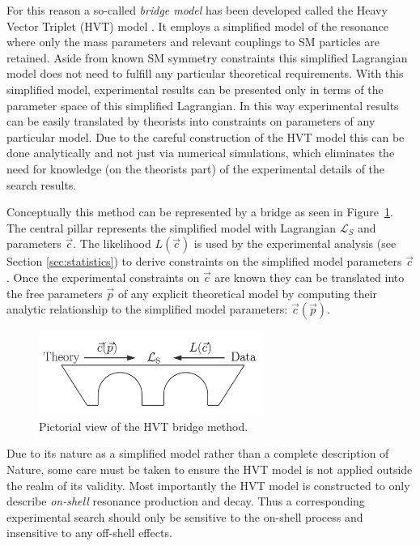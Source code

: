For this reason a so-called \textit{bridge model} has been developed called the Heavy Vector Triplet (HVT) model \cite{Pappadopulo:2014qza}.
It employs a simplified model of the resonance where only the mass parameters and relevant couplings to SM particles are retained.
Aside from known SM symmetry constraints this simplified Lagrangian model does not need to fulfill any particular theoretical requirements.
With this simplified model, experimental results can be presented only in terms of the parameter space of this simplified Lagrangian.
In this way experimental results can be easily translated by theorists into constraints on parameters of any particular model.
Due to the careful construction of the HVT model this can be done analytically and not just via numerical simulations, which eliminates the need for knowledge (on the theorists part) of the experimental details of the search results.

Conceptually this method can be represented by a bridge as seen in Figure~\ref{fig:hvt_bridge}.
The central pillar represents the simplified model with Lagrangian $\mathcal{L}_S$ and parameters $\vec{c}$.
The likelihood $L(\vec{c})$ is used by the experimental analysis (see Section \ref{sec:statistics}) to derive constraints on the simplified model parameters $\vec{c}$.
Once the experimental constraints on $\vec{c}$ are known they can be translated into the free parameters $\vec{p}$ of any explicit theoretical model by computing their analytic relationship to the simplified model parameters: $\vec{c}(\vec{p})$.

\begin{figure}
	\centering
	\includegraphics[width=0.65\textwidth,origin=c]{hvt_bridge}
	\caption{
	Pictorial view of the HVT bridge method. \cite{Pappadopulo:2014qza}
	}
	\label{fig:hvt_bridge}
\end{figure}

Due to its nature as a simplified model rather than a complete description of Nature, some care must be taken to ensure the HVT model is not applied outside the realm of its validity.
Most importantly the HVT model is constructed to only describe \textit{on-shell} resonance production and decay.
Thus a corresponding experimental search should only be sensitive to the on-shell process and insensitive to any off-shell effects.

